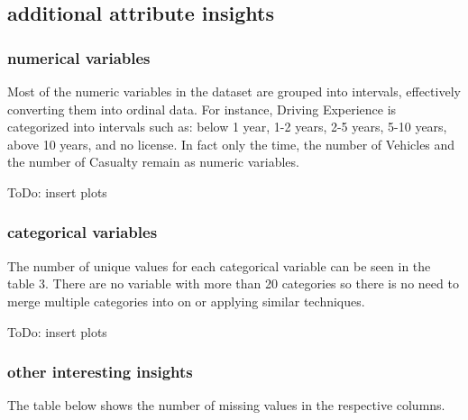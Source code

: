 \documentclass{article}
\begin{document}
\subsection{additional attribute insights}

\subsubsection{numerical variables}

Most of the numeric variables in the dataset are grouped into intervals, effectively converting them into ordinal data. For instance, Driving Experience is categorized into intervals such as: below 1 year, 1-2 years, 2-5 years, 5-10 years, above 10 years, and no license. In fact only the time, the number of Vehicles and the number of Casualty remain as numeric variables. \newline

ToDo: insert plots

\subsubsection{categorical variables}

The number of unique values for each categorical variable can be seen in the table 3. There are no variable with more than 20 categories so there is no need to merge multiple categories into on or applying similar techniques. \newline

ToDo: insert plots

\subsubsection{other interesting insights}
The table below shows the number of missing values in the respective columns. 
\end{document}
